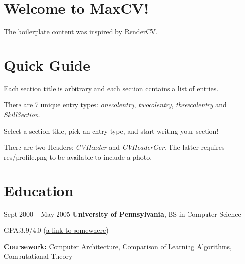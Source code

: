\documentclass{maxcv}
\begin{document}
\CVHeader{}

\section{Welcome to MaxCV!}
\begin{onecolentry}
    The boilerplate content was inspired by \href{https://github.com/rendercv/}{RenderCV}.
\end{onecolentry}

\section{Quick Guide}

\begin{onecolentry}
    \begin{highlightsforbulletentries}
        \item Each section title is arbitrary and each section contains a list of entries.
        \item There are 7 unique entry types: \textit{onecolentry}, \textit{twocolentry}, \textit{threecolentry} and \textit{SkillSection}.
        \item Select a section title, pick an entry type, and start writing your section!
        \item There are two Headers: \textit{CVHeader} and \textit{CVHeaderGer}. The latter requires res/profile.png to be available to include a photo.
    \end{highlightsforbulletentries}
\end{onecolentry}


\section{Education}
\begin{twocolentry}{
        Sept 2000 – May 2005
    }
    \textbf{University of Pennsylvania}, BS in Computer Science\end{twocolentry}

\vspace{0.10 cm}
\begin{onecolentry}
    \begin{highlights}
        \item GPA:\@ 3.9/4.0 (\href{https://example.com}{a link to somewhere})
        \item \textbf{Coursework:} Computer Architecture, Comparison of Learning Algorithms, Computational Theory
    \end{highlights}
\end{onecolentry}
\end{document}
